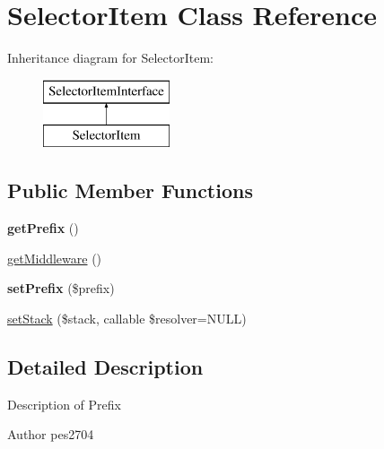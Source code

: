 \hypertarget{class_pes_1_1_middleware_1_1_selector_item}{}\section{Selector\+Item Class Reference}
\label{class_pes_1_1_middleware_1_1_selector_item}
Inheritance diagram for Selector\+Item\+:\begin{figure}[H]
\begin{center}
\leavevmode
\includegraphics[height=2.000000cm]{class_pes_1_1_middleware_1_1_selector_item}
\end{center}
\end{figure}
\subsection*{Public Member Functions}
\begin{DoxyCompactItemize}
\item 
\mbox{\label{class_pes_1_1_middleware_1_1_selector_item_a7a333affb97cf092d50f3e59edaa9066}} 
{\bfseries get\+Prefix} ()
\item 
\mbox{\hyperlink{class_pes_1_1_middleware_1_1_selector_item_af09a4d42693ca813040ddf1ebb7a306f}{get\+Middleware}} ()
\item 
\mbox{\label{class_pes_1_1_middleware_1_1_selector_item_a523b9bda674fc27df98f0da0b3f3276c}} 
{\bfseries set\+Prefix} (\$prefix)
\item 
\mbox{\hyperlink{class_pes_1_1_middleware_1_1_selector_item_a45338158e6ea2a7b58612339ccc85717}{set\+Stack}} (\$stack, callable \$resolver=N\+U\+LL)
\end{DoxyCompactItemize}


\subsection{Detailed Description}
Description of Prefix

\begin{DoxyAuthor}{Author}
pes2704 
\end{DoxyAuthor}


